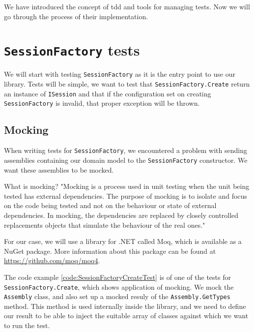 We have introduced the concept of \acrshort{tdd} and tools for managing tests.
Now we will go through the process of their implementation.

\section{\texttt{SessionFactory} tests}

We will start with testing \texttt{SessionFactory} as it is the entry point to use our library. Tests will be simple,
we want to test that \texttt{SessionFactory.Create} return an instance of \texttt{ISession} and that if the configuration
set on creating \texttt{SessionFactory} is invalid, that proper exception will be thrown.

\subsection{Mocking}

When writing tests for \texttt{SessionFactory}, we encountered a problem with sending assemblies containing our domain model to the \texttt{SessionFactory} constructor.
We want these assemblies to be mocked.

What is mocking? "Mocking is a process used in unit testing when the unit being tested has external dependencies.
The purpose of mocking is to isolate and focus on the code being tested and not on the behaviour or state of external dependencies.
In mocking, the dependencies are replaced by closely controlled replacements objects that simulate the behaviour of the real ones." \cite{progress_software_corporation_mocking_nodate}

For our case, we will use a library for .NET called Moq, which is available as a NuGet package.
More information about this package can be found at \url{https://github.com/moq/moq4}.

The code example \ref{code:SessionFactoryCreateTest} is of one of the tests for \texttt{SessionFactory.Create}, which shows application of mocking.
We mock the \texttt{Assembly} class, and also set up a mocked resuly of the \texttt{Assembly.GetTypes} method.
This method is used internally inside the library, and we need to define our result to be able to inject the suitable array of classes against which we want to run the test.

